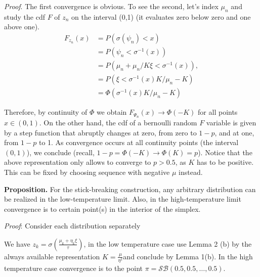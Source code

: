 \documentclass[twoside]{article}
\begin{document}
\textit{Proof}. The first convergence is obvious. To see the second, let's index $\mu_n$ and  study the cdf $F$ of $z_n$ on the interval (0,1) (it evaluates zero below zero and one above one).
\begin{align}F_{z_n}(x)&= P(\sigma(\psi_n)<x) \\
&=P(\psi_n< \sigma^{-1}(x))\\
&=P(\mu_n +\mu_n/K\xi <\sigma^{-1}(x)),\\\
&= P( \xi <\sigma^{-1}(x)K/\mu_n - K)\\
&= \Phi( \sigma^{-1}(x)K/\mu_n - K) 
\end{align}

Therefore, by continuity of $\Phi$ we obtain $F_{\Psi_n}(x)\rightarrow \Phi(-K)$ for all points $x\in(0,1)$. On the other hand, the cdf of a bernoulli random $F$ variable is given by  a step function that abruptly changes at zero, from zero to $1-p$, and at one, from $1-p$ to 1. As convergence occurs at all continuity points (the interval $(0,1)$), we conclude (recall, $1-p= \Phi(-K)\rightarrow \Phi(K)=p$). Notice that the above representation only allows  to converge to $p>0.5$, as $K$ has to be positive. This can be fixed by choosing sequence with negative $\mu$ instead.

\textbf{Proposition.} For the stick-breaking construction, any arbitrary distribution can be realized in the low-temperature limit. Also, in the high-temperature limit convergence is to certain point(s) in the interior of the simplex.

\textit{Proof}: Consider each distribution separately

We have $z_k = \sigma\left( \frac{\mu_k+\eta_k\xi}{\tau}\right)$, in the low temperature case use Lemma 2 (b) by the always available representation  $K= \frac{\mu}{\eta^2}$and conclude by Lemma 1(b). In the high temperature case convergence is to the point $\pi = \mathcal{SB}(0.5,0.5,\ldots, 0.5)$.


\end{document}
